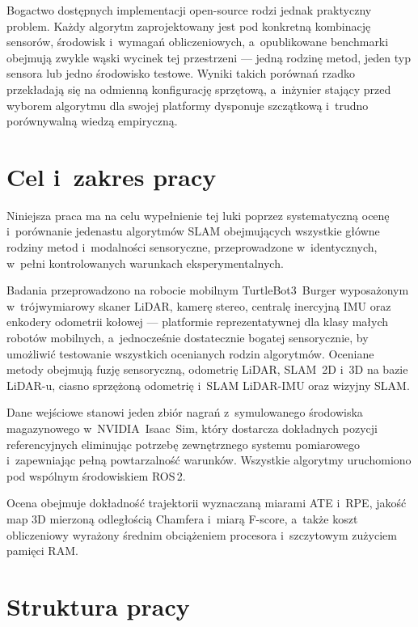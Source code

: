 Bogactwo dostępnych implementacji open-source rodzi jednak praktyczny problem.
Każdy algorytm zaprojektowany jest pod konkretną kombinację sensorów, środowisk
i~wymagań obliczeniowych, a~opublikowane benchmarki obejmują zwykle wąski wycinek
tej przestrzeni --- jedną rodzinę metod, jeden typ sensora lub jedno środowisko
testowe.
Wyniki takich porównań rzadko przekładają się na odmienną konfigurację sprzętową,
a~inżynier stający przed wyborem algorytmu dla swojej platformy dysponuje
szczątkową i~trudno porównywalną wiedzą empiryczną.

\section{Cel i~zakres pracy}

Niniejsza praca ma na celu wypełnienie tej luki poprzez systematyczną ocenę
i~porównanie jedenastu algorytmów SLAM obejmujących wszystkie główne rodziny
metod i~modalności sensoryczne, przeprowadzone w~identycznych, w~pełni
kontrolowanych warunkach eksperymentalnych.

Badania przeprowadzono na robocie mobilnym TurtleBot3~Burger wyposażonym
w~trójwymiarowy skaner LiDAR, kamerę stereo, centralę inercyjną IMU oraz
enkodery odometrii kołowej --- platformie reprezentatywnej dla klasy małych
robotów mobilnych, a~jednocześnie dostatecznie bogatej sensorycznie,
by umożliwić testowanie wszystkich ocenianych rodzin algorytmów.
Oceniane metody obejmują fuzję sensoryczną, odometrię LiDAR, SLAM~2D i~3D
na bazie LiDAR-u, ciasno sprzężoną odometrię i~SLAM LiDAR-IMU oraz wizyjny SLAM.

Dane wejściowe stanowi jeden zbiór nagrań z~symulowanego środowiska magazynowego
w~NVIDIA~Isaac~Sim, który dostarcza dokładnych pozycji referencyjnych
eliminując potrzebę zewnętrznego systemu pomiarowego i~zapewniając pełną
powtarzalność warunków.
Wszystkie algorytmy uruchomiono pod wspólnym środowiskiem ROS\,2.

Ocena obejmuje dokładność trajektorii wyznaczaną miarami ATE i~RPE,
jakość map 3D mierzoną odległością Chamfera i~miarą F-score,
a~także koszt obliczeniowy wyrażony średnim obciążeniem procesora
i~szczytowym zużyciem pamięci RAM.

\section{Struktura pracy}

\begingroup
\setlength{\parskip}{2pt}
\setlength{\parindent}{1.5em}

